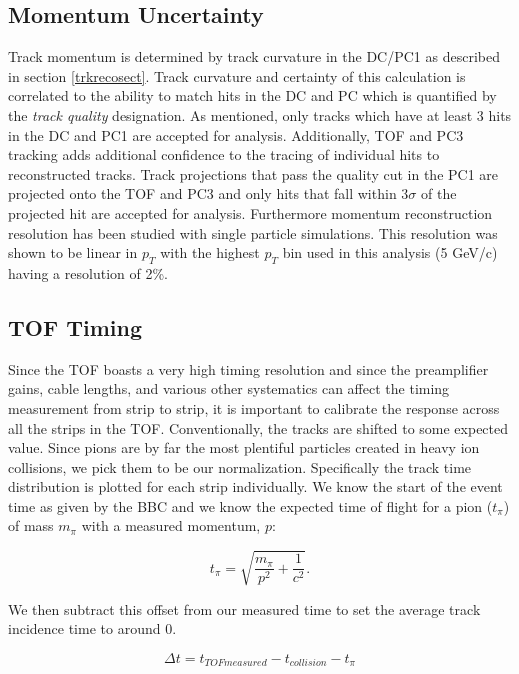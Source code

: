 \subsection{Momentum Uncertainty}
Track momentum is determined by track curvature in the DC/PC1 as described in section \ref{trkrecosect}. Track curvature and certainty of this calculation is correlated to the ability to match hits in the DC and PC which is quantified by the \textit{track quality} designation. As mentioned, only tracks which have at least 3 hits in the DC and PC1 are accepted for analysis. Additionally, TOF and PC3 tracking adds additional confidence to the tracing of individual hits to reconstructed tracks. Track projections that pass the quality cut in the PC1 are projected onto the TOF and PC3 and only hits that fall within $3\sigma$ of the projected hit are accepted for analysis. Furthermore momentum reconstruction resolution has been studied with single particle simulations\citep{Mitchell:2002wu}. This resolution was shown to be linear in $p_T$ with the highest $p_T$ bin used in this analysis (5 GeV/c) having a resolution of 2\%.
 
\subsection{TOF Timing}
Since the TOF boasts a very high timing resolution and since the preamplifier gains, cable lengths, and various other systematics can affect the timing measurement from strip to strip, it is important to calibrate the response across all the strips in the TOF. Conventionally, the tracks are shifted to some expected value. Since pions are by far the most plentiful particles created in heavy ion collisions, we pick them to be our normalization. Specifically the track time distribution is plotted for each strip individually. We know the start of the event time as given by the BBC and we know the expected time of flight for a pion ($t_{\pi}$) of mass $m_{\pi}$ with a measured momentum, $p$:

\begin{equation}
t_{\pi} = \sqrt{\frac{m_{\pi}}{p^2} + \frac{1}{c^2}}.
\end{equation}

We then subtract this offset from our measured time to set the average track incidence time to around 0.

\begin{equation}
\Delta t = t_{TOF measured} - t_{collision} - t_{\pi} 
\end{equation}
 
